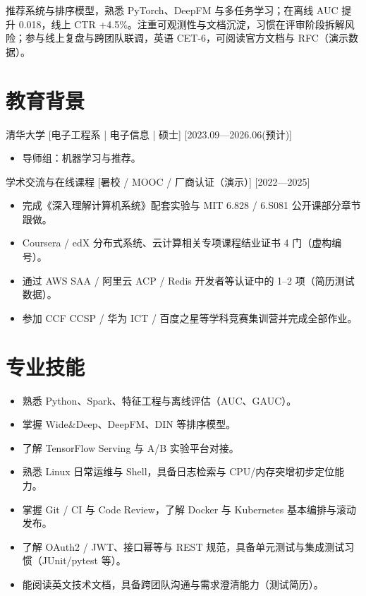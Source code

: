 \documentclass{resume-photo}
\begin{document}

\ResumeTitle

\noindent 推荐系统与排序模型，熟悉 PyTorch、DeepFM 与多任务学习；在离线 AUC 提升 0.018，线上 CTR +4.5\%。注重可观测性与文档沉淀，习惯在评审阶段拆解风险；参与线上复盘与跨团队联调，英语 CET-6，可阅读官方文档与 RFC（演示数据）。

\section{教育背景}
\ResumeItem
{清华大学}
[\textnormal{电子工程系 | 电子信息 | 硕士}]
[2023.09—2026.06(预计)]

\begin{itemize}
  \item 导师组：机器学习与推荐。
\end{itemize}


\ResumeItem
{学术交流与在线课程}
[\textnormal{暑校 / MOOC / 厂商认证（演示）}]
[2022—2025]

\begin{itemize}
  \item 完成《深入理解计算机系统》配套实验与 MIT 6.828 / 6.S081 公开课部分章节跟做。
  \item Coursera / edX 分布式系统、云计算相关专项课程结业证书 4 门（虚构编号）。
  \item 通过 AWS SAA / 阿里云 ACP / Redis 开发者等认证中的 1--2 项（简历测试数据）。
  \item 参加 CCF CCSP / 华为 ICT / 百度之星等学科竞赛集训营并完成全部作业。
\end{itemize}



\section{专业技能}
\begin{itemize}
  \item 熟悉 Python、Spark、特征工程与离线评估（AUC、GAUC）。
  \item 掌握 Wide\&Deep、DeepFM、DIN 等排序模型。
  \item 了解 TensorFlow Serving 与 A/B 实验平台对接。
  \item 熟悉 Linux 日常运维与 Shell，具备日志检索与 CPU/内存突增初步定位能力。
  \item 掌握 Git / CI 与 Code Review，了解 Docker 与 Kubernetes 基本编排与滚动发布。
  \item 了解 OAuth2 / JWT、接口幂等与 REST 规范，具备单元测试与集成测试习惯（JUnit/pytest 等）。
  \item 能阅读英文技术文档，具备跨团队沟通与需求澄清能力（测试简历）。
\end{itemize}
\end{document}
